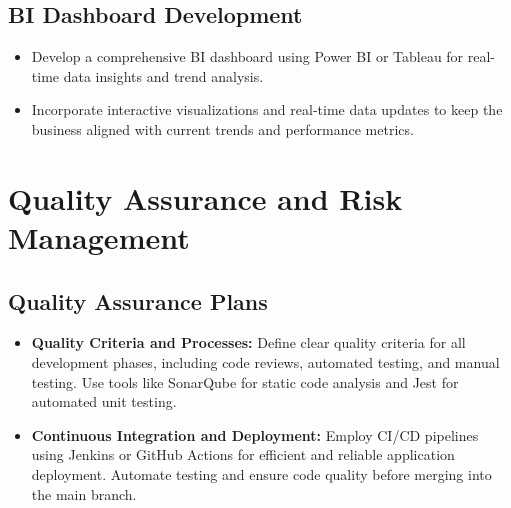 \documentclass[11pt]{article}
\begin{document}
	\subsection*{BI Dashboard Development}
	\begin{itemize}
		\item Develop a comprehensive BI dashboard using Power BI or Tableau for real-time data insights and trend analysis.
		\item Incorporate interactive visualizations and real-time data updates to keep the business aligned with current trends and performance metrics.
	\end{itemize}
	
	\section*{Quality Assurance and Risk Management}
	
	\subsection*{Quality Assurance Plans}
	\begin{itemize}
		\item \textbf{Quality Criteria and Processes:} Define clear quality criteria for all development phases, including code reviews, automated testing, and manual testing. Use tools like SonarQube for static code analysis and Jest for automated unit testing.
		\item \textbf{Continuous Integration and Deployment:} Employ CI/CD pipelines using Jenkins or GitHub Actions for efficient and reliable application deployment. Automate testing and ensure code quality before merging into the main branch.
	\end{itemize}
	
\end{document}
